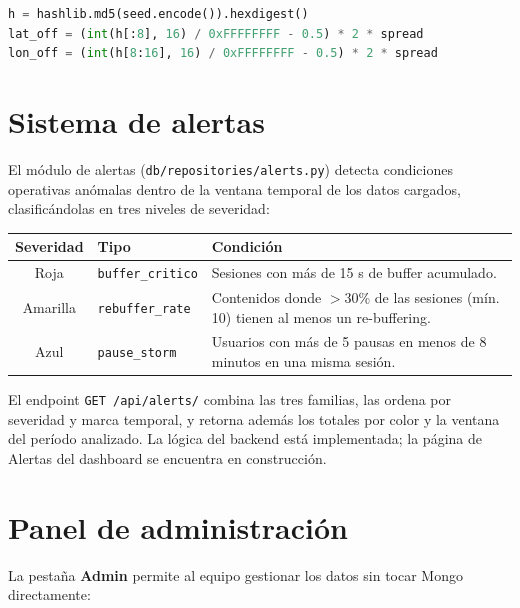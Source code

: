 \documentclass[12pt, letterpaper]{article}
\newcommand{\code}[1]{\texttt{#1}}
\begin{document}
\begin{lstlisting}[language=Python,caption={Jitter determinístico (db/repositories/overview.py)}]
h = hashlib.md5(seed.encode()).hexdigest()
lat_off = (int(h[:8], 16) / 0xFFFFFFFF - 0.5) * 2 * spread
lon_off = (int(h[8:16], 16) / 0xFFFFFFFF - 0.5) * 2 * spread
\end{lstlisting}

\section{Sistema de alertas}
El módulo de alertas (\code{db/repositories/alerts.py}) detecta condiciones
operativas anómalas dentro de la ventana temporal de los datos cargados,
clasificándolas en tres niveles de severidad:

\begin{center}
\begin{tabular}{@{}clL{6.5cm}@{}}
\toprule
\textbf{Severidad} & \textbf{Tipo} & \textbf{Condición} \\
\midrule
Roja & \code{buffer\_critico} & Sesiones con más de 15 s de buffer acumulado. \\
Amarilla & \code{rebuffer\_rate} & Contenidos donde $>30\%$ de las sesiones (mín. 10) tienen al menos un re-buffering. \\
Azul & \code{pause\_storm} & Usuarios con más de 5 pausas en menos de 8 minutos en una misma sesión. \\
\bottomrule
\end{tabular}
\end{center}

El endpoint \code{GET /api/alerts/} combina las tres familias, las ordena por
severidad y marca temporal, y retorna además los totales por color y la ventana
del período analizado. La lógica del backend está implementada; la página de
Alertas del dashboard se encuentra en construcción.

\section{Panel de administración}
La pestaña \textbf{Admin} permite al equipo gestionar los datos sin tocar Mongo
directamente:
\end{document}

